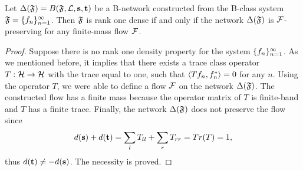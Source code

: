 \documentclass[12pt,oneside,a4paper]{amsart}
\begin{document}
      \begin{theorem}
        \label{thm-graph-eq}
          Let $\net(\fsys) = B(\fsys, \len, \source, \sink)$ be a B-network constructed
            from the B-class system $\fsys = \seq{f}$.
          Then $\fsys$ is rank one dense if and only if
            the network $\net(\fsys)$ is $\flow$-preserving for any finite-mass flow $\flow$.
      \end{theorem}
      \begin{proof}
        Suppose there is no rank one density property for the system $\seq{f}$.
        As we mentioned before, it implies that there exists a trace class operator $T: \cal{H} \to \cal{H}$ with
          the trace equal to one, such that $\inner{Tf_n}{f_n^*} = 0$ for any $n$.
        Using the operator $T$, we were able to define a flow $\flow$ on the network $\net(\fsys)$.
        The constructed flow has a finite mass because the operator matrix of $T$ is finite-band and $T$ has a finite trace.
        Finally, the network $\net(\fsys)$ does not preserve the flow since
        \[
          d(\source) + d(\sink) = \sum_{l} T_{ll} + \sum_{r} T_{rr} = Tr(T) = 1,
        \]
        thus $d(\sink) \neq -d(\source)$.
        The necessity is proved.


\end{proof}
\end{document}
